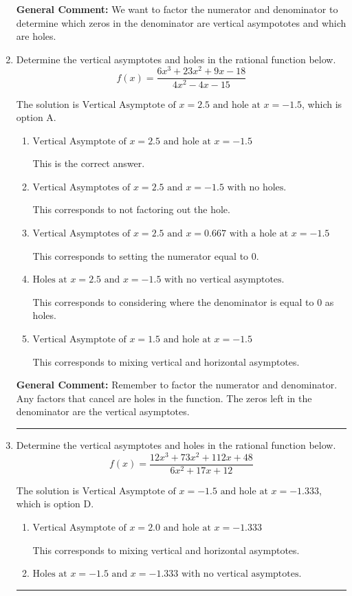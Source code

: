 \documentclass{extbook}[14pt]
\newcommand{\litem}[1]{\item #1

\rule{\textwidth}{0.4pt}}
\begin{document}
\begin{enumerate}
{\textbf{General Comment:} We want to factor the numerator and denominator to determine which zeros in the denominator are vertical asympototes and which are holes.
}
\litem{
Determine the vertical asymptotes and holes in the rational function below.
\[ f(x) = \frac{6x^{3} +23 x^{2} +9 x -18}{4x^{2} -4 x -15} \]

The solution is \( \text{Vertical Asymptote of } x = 2.5 \text{ and hole at } x = -1.5 \), which is option A.\begin{enumerate}[label=\Alph*.]
\item \( \text{Vertical Asymptote of } x = 2.5 \text{ and hole at } x = -1.5 \)

This is the correct answer.
\item \( \text{Vertical Asymptotes of } x = 2.5 \text{ and } x = -1.5 \text{ with no holes.} \)

This corresponds to not factoring out the hole.
\item \( \text{Vertical Asymptotes of } x = 2.5 \text{ and } x = 0.667 \text{ with a hole at } x = -1.5 \)

This corresponds to setting the numerator equal to 0.
\item \( \text{Holes at } x = 2.5 \text{ and } x = -1.5 \text{ with no vertical asymptotes.} \)

This corresponds to considering where the denominator is equal to 0 as holes.
\item \( \text{Vertical Asymptote of } x = 1.5 \text{ and hole at } x = -1.5 \)

This corresponds to mixing vertical and horizontal asymptotes.
\end{enumerate}

\textbf{General Comment:} Remember to factor the numerator and denominator. Any factors that cancel are holes in the function. The zeros left in the denominator are the vertical asymptotes.
}
\litem{
Determine the vertical asymptotes and holes in the rational function below.
\[ f(x) = \frac{12x^{3} +73 x^{2} +112 x + 48}{6x^{2} +17 x + 12} \]

The solution is \( \text{Vertical Asymptote of } x = -1.5 \text{ and hole at } x = -1.333 \), which is option D.\begin{enumerate}[label=\Alph*.]
\item \( \text{Vertical Asymptote of } x = 2.0 \text{ and hole at } x = -1.333 \)

This corresponds to mixing vertical and horizontal asymptotes.
\item \( \text{Holes at } x = -1.5 \text{ and } x = -1.333 \text{ with no vertical asymptotes.} \)


\end{enumerate}}
\end{enumerate}
\end{document}
